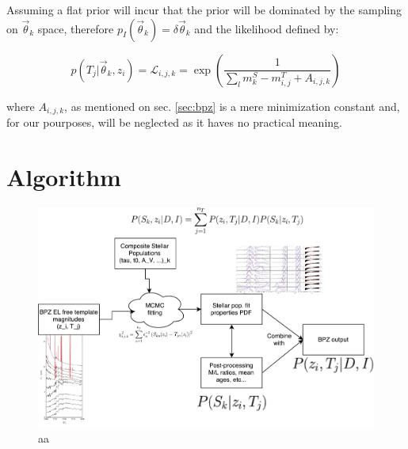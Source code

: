\documentclass[9pt]{memoir}
\begin{document}
Assuming a flat prior will incur that the prior will be dominated by the sampling on $\vec{\theta}_k$ space, therefore $p_I (\vec{\theta}_k) = \delta \vec{\theta}_k$ and the likelihood defined by:

\begin{equation}
p(T_j|\vec{\theta}_k, z_i) = \mathcal{L}_{i,j,k} = \exp \left( \frac{1}{\sum_l m^S_k - m^T_{i,j} + A_{i,j,k}} \right)
\end{equation}

where $A_{i,j,k}$, as mentioned on sec. \ref{sec:bpz} is a mere minimization constant and, for our pourposes, will be neglected as it haves no practical meaning.

\section{Algorithm}

\begin{figure}
\begin{adjustwidth*}{1in}{0pt}
\centering
\includegraphics[width=.8\textwidth]{figures/mass_pdf.pdf}
\end{adjustwidth*}
\caption{aa}
\label{fig:algorithm}
\end{figure}
\end{document}
